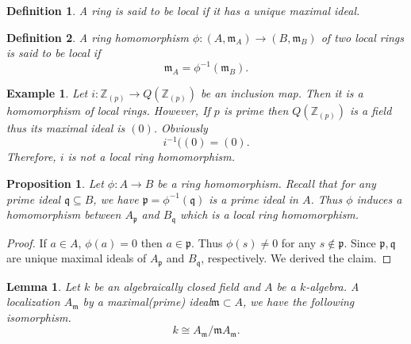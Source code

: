 \documentclass{article}
\newtheorem{proposition}{Proposition}[section]
\newtheorem{definition}{Definition}[section]
\newtheorem{lemma}{Lemma}[section]
\newtheorem{example}{Example}[section]
\numberwithin{equation}{section}
\begin{document}
\begin{definition}
A ring is said to be local if it has a unique maximal ideal.
\end{definition}

\begin{definition}
A ring homomorphism $\phi:(A,\mathfrak{m}_A)\to (B,\mathfrak{m}_B)$ of two local rings is said to be local if 
\begin{equation*}
\mathfrak{m}_A = \phi^{-1}(\mathfrak{m}_B).
\end{equation*}
\end{definition}

\begin{example}
Let $i:\mathbb{Z}_{(p)}\to Q(\mathbb{Z}_{(p)})$ be an inclusion map. Then it is a homomorphism of local rings. However, If $p$ is prime then $Q(\mathbb{Z}_{(p)})$ is a field thus its maximal ideal is $(0)$. Obviously
\begin{equation*}
i^{-1}((0) = (0).
\end{equation*}
Therefore, $i$ is not a local ring homomorphism.
\end{example}

\begin{proposition}
Let $\phi:A\to B$ be a ring homomorphism. Recall that for any prime ideal $\mathfrak{q}\subseteq B$, we have $\mathfrak{p}=\phi^{-1}(\mathfrak{q})$ is a prime ideal in $A$. Thus $\phi$ induces a homomorphism between $A_{\mathfrak{p}}$ and $B_{\mathfrak{q}}$ which is a local ring homomorphism.
\end{proposition}

\begin{proof}
If $a\in A$, $\phi(a)=0$ then $a\in\mathfrak{p}$. Thus $\phi(s)\not=0$ for any $s\not\in\mathfrak{p}$. Since $\mathfrak{p},\mathfrak{q}$ are unique maximal ideals of  $A_{\mathfrak{p}}$ and $B_{\mathfrak{q}}$, respectively. We derived the claim.
\end{proof}

\begin{lemma}
Let $k$ be an algebraically closed field and $A$ be a $k$-algebra. A localization $A_{\mathfrak{m}}$ by a maximal(prime) ideal$\mathfrak{m}\subset A$, we have the following isomorphism.
\begin{equation*}
k\cong A_{\mathfrak{m}}/\mathfrak{m}A_{\mathfrak{m}}.
\end{equation*}
\label{k_algebra_localization}
\end{lemma}
\end{document}
